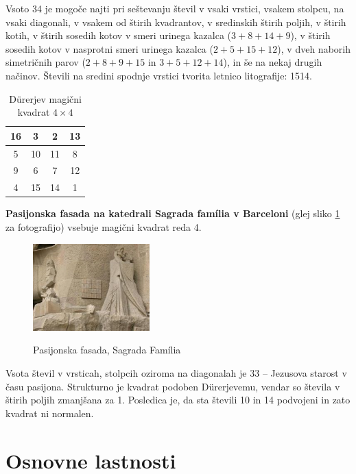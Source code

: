 \documentclass[a4paper,12pt]{article}
\begin{document}
Vsoto 34 je mogoče najti pri seštevanju števil v vsaki vrstici, vsakem stolpcu,
na vsaki diagonali, v vsakem od štirih kvadrantov, v sredinskih štirih poljih,
v štirih kotih, v štirih sosedih kotov v smeri urinega kazalca ($3+8+14+9$), v
štirih sosedih kotov v nasprotni smeri urinega kazalca ($2+5+15+12$), v dveh naborih
simetričnih parov ($2+8+9+15$ in $3+5+12+14$), in še na nekaj drugih načinov.
Števili na sredini spodnje vrstici tvorita letnico litografije: 1514.

\begin{table}[h!]
   \centering
   \caption{Dürerjev magični kvadrat $4\times 4$}
   \label{table:durer}
   \begin{tabular}{|c|c|c|c|}
   \hline
   16 &  3 &  2 & 13 \\\hline
      5 & 10 & 11 &  8 \\\hline
      9 &  6 &  7 & 12 \\\hline
      4 & 15 & 14 &  1 \\\hline
   \end{tabular}
\end{table}

\textbf{Pasijonska fasada na katedrali Sagrada família v Barceloni}
(glej sliko \ref{fig:sagrada} za fotografijo) vsebuje magični kvadrat reda 4.

\begin{figure}[h!]
   \centering
   \caption{Pasijonska fasada, Sagrada Família}
   \includegraphics[width=0.4\textwidth]{sagrada.png} 
   \label{fig:sagrada}
\end{figure}

Vsota števil v vrsticah, stolpcih oziroma na diagonalah je 33 -- Jezusova starost
v času pasijona. Strukturno je kvadrat podoben Dürerjevemu, vendar so števila
v štirih poljih zmanjšana za 1. Posledica je, da sta števili 10 in 14 podvojeni
in zato kvadrat ni normalen.


\newcommand{\M}{\emph{M}}

\section{Osnovne lastnosti}
\end{document}
